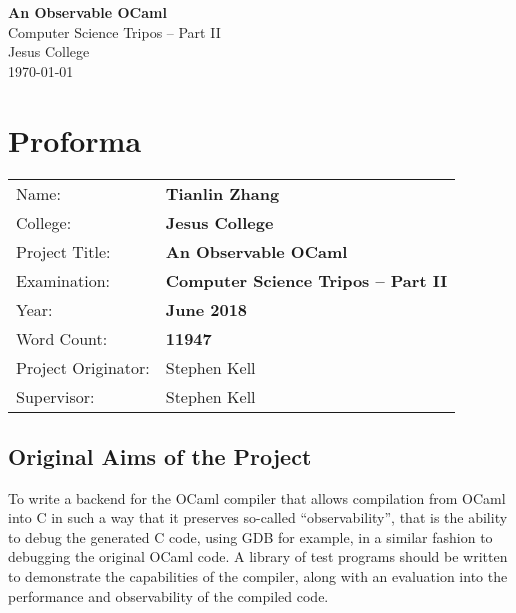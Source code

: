 \documentclass[12pt,a4paper,twoside,openright]{report}
\begin{document}





\pagestyle{empty}


\vspace*{60mm}
\begin{center}
\Huge
\textbf{An Observable OCaml} \\[5mm]
Computer Science Tripos -- Part II \\[5mm]
Jesus College \\[5mm]
\today  %
\end{center}


\pagestyle{plain}

\chapter*{Proforma}

{\large
\begin{tabular}{ll}
Name:               & \bf Tianlin Zhang \\
College:            & \bf Jesus College\\
Project Title:      & \bf An Observable OCaml\\
Examination:        & \bf Computer Science Tripos -- Part II\\
Year:               & \bf June 2018\\
Word Count:         & \bf 11947\footnotemark \\
Project Originator: & Stephen Kell \\
Supervisor:         & Stephen Kell \\ 
\end{tabular}
}

\section*{Original Aims of the Project}

To write a backend for the OCaml compiler that allows compilation from OCaml 
into C in such a way that it preserves so-called ``observability'', that is the 
ability to debug the generated C code, using GDB for example, in a similar 
fashion to debugging the original OCaml code. A library of test programs should 
be written to demonstrate the capabilities of the compiler, along with an 
evaluation into the performance and observability of the compiled code.
\end{document}
